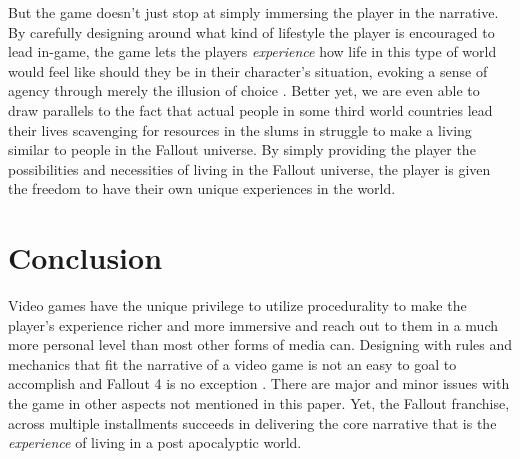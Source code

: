 \documentclass[12pt, conference]{IEEEtran}
\begin{document}
But the game doesn't just stop at simply immersing the player in the narrative. By carefully designing around what kind of lifestyle the player is encouraged to lead in-game, the game lets the players \emph{experience} how life in this type of world would feel like should they be in their character's situation, evoking a sense of agency through merely the illusion of choice \cite{hogle}. Better yet, we are even able to draw parallels to the fact that actual people in some third world countries lead their lives scavenging for resources in the slums in struggle to make a living similar to people in the Fallout universe. By simply providing the player the possibilities and necessities of living in the Fallout universe, the player is given the freedom to have their own unique experiences in the world.\\

\section{Conclusion}

Video games have the unique privilege to utilize procedurality to make the player's experience richer and more immersive and reach out to them in a much more personal level than most other forms of media can. Designing with rules and mechanics that fit the narrative of a video game is not an easy to goal to accomplish and Fallout 4 is no exception \cite{anderson}. There are major and minor issues with the game in other aspects not mentioned in this paper. Yet, the Fallout franchise, across multiple installments succeeds in delivering the core narrative that is the \emph{experience} of living in a post apocalyptic world.\\




%
%
\end{document}

